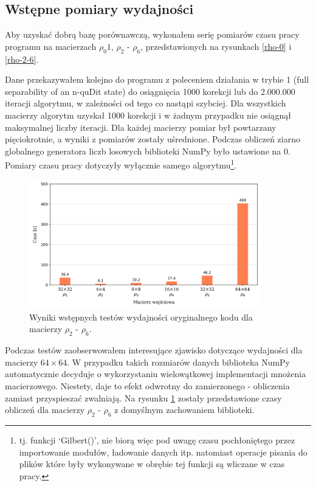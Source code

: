 \documentclass[11pt, a4paper]{article}
\begin{document}
\begin{sloppypar}
    \subsection{Wstępne pomiary wydajności}


    Aby uzyskać dobrą bazę porównawczą, wykonałem serię pomiarów czasu pracy programu na
    macierzach $\rho_{0}1$, $\rho_{2}$ - $\rho_{6}$, przedstawionych na rysunkach
    \ref{rho-0} i \ref{rho-2-6}.

    Dane przekazywałem kolejno do programu z poleceniem działania w trybie 1 (full separability
    of an n-quDit state) do osiągnięcia 1000 korekcji lub do 2.000.000 iteracji algorytmu,
    w zależności od tego co nastąpi szybciej. Dla wszystkich macierzy algorytm uzyskał 1000
    korekcji i w żadnym przypadku nie osiągnął maksymalnej liczby iteracji. Dla każdej
    macierzy pomiar był powtarzany pięciokrotnie, a wyniki z pomiarów zostały uśrednione.
    Podczas obliczeń ziarno globalnego generatora liczb losowych biblioteki NumPy było
    ustawione na 0. Pomiary czasu pracy dotyczyły wyłącznie samego algorytmu\footnote{tj.
    funkcji `Gilbert()', nie biorą więc pod uwagę czasu pochłoniętego przez importowanie
    modułów, ładowanie danych itp. natomiast operacje pisania do plików które były wykonywane
    w obrębie tej funkcji są wliczane w czas pracy.}.

    \FloatBarrier
    \begin{figure}[ht]
      \centering
      \includegraphics[width=0.9\textwidth]{"resources/original_performance_tests.png"}
      \caption{Wyniki wstępnych testów wydajności oryginalnego kodu dla macierzy $\rho_{2}$ - $\rho
      _{6}$.}
      \label{pre-perf}
    \end{figure}
    \FloatBarrier

    Podczas testów zaobserwowałem interesujące zjawisko dotyczące wydajności dla
    macierzy $64\times64$. W przypadku takich rozmiarów danych biblioteka NumPy automatycznie
    decyduje o wykorzystaniu wielowątkowej implementacji mnożenia macierzowego. Niestety,
    daje to efekt odwrotny do zamierzonego - obliczenia zamiast przyspieszać zwalniają.
    Na rysunku \ref{pre-perf} zostały przedstawione czasy obliczeń dla macierzy
    $\rho_{2}$ - $\rho_{6}$ z domyślnym zachowaniem biblioteki.


\end{sloppypar}
\end{document}
